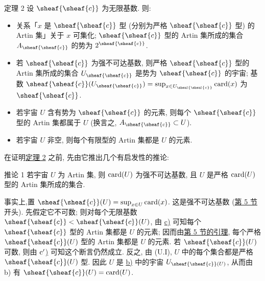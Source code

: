 \hypertarget{sga4.exp.I.appendix.II.sec.6.theorem.2}{}
\begin{enonce*}{定理 2}
设 $\sheaf{\sheaf{c}}$ 为无限基数. 则:
\begin{itemize}
\hypertarget{sga4.exp.I.appendix.II.sec.6.theorem.2.part.a}{}
\item[a)] 关系「$x$ 是 $\sheaf{\sheaf{c}}$ 型 (分别为严格 $\sheaf{\sheaf{c}}$ 型) 的 Artin 集」关于 $x$ 可集化; $\sheaf{\sheaf{c}}$ 型的 Artin 集所成的集合 $A_{\sheaf{\sheaf{c}}}$ 的势为 $2^{\sheaf{\sheaf{c}}}$.

\hypertarget{sga4.exp.I.appendix.II.sec.6.theorem.2.part.b}{}
\item[b)] 若 $\sheaf{\sheaf{c}}$ 为强不可达基数, 则严格 $\sheaf{\sheaf{c}}$ 型的 Artin 集所成的集合 $U_{\sheaf{\sheaf{c}}}$ 是势为 $\sheaf{\sheaf{c}}$ 的宇宙; 基数 $\sheaf{\sheaf{c}}(U_{\sheaf{\sheaf{c}}})=\sup_{x\in U_{\sheaf{\sheaf{c}}}}\card(x)$ 为 $\sheaf{\sheaf{c}}$.

\hypertarget{sga4.exp.I.appendix.II.sec.6.theorem.2.part.c}{}
\item[c)] 若宇宙 $U$ 含有势为 $\sheaf{\sheaf{c}}$ 的元素, 则每个 $\sheaf{\sheaf{c}}$ 型的 Artin 集都属于 $U$ (换言之, $A_{\sheaf{\sheaf{c}}}\subset U$).

\hypertarget{sga4.exp.I.appendix.II.sec.6.theorem.2.part.c-prime}{}
\item[${\rm c')}$] 若宇宙 $U$ 非空, 则每个有限型的 Artin 集都是 $U$ 的元素.
\end{itemize}
\end{enonce*}
在证明\hyperlink{sga4.exp.I.appendix.II.sec.6.theorem.2}{定理 2} 之前, 先由它推出几个有启发性的推论:

\hypertarget{sga4.exp.I.appendix.II.sec.6.corollary.to.theorem.2.1}{}
\begin{enonce*}{推论 1}
若宇宙 $U$ 为 Artin 集, 则 $\operatorname{card}(U)$ 为强不可达基数, 且 $U$ 是严格 $\operatorname{card}(U)$ 型的 Artin 集所成的集合.
\end{enonce*}

事实上,\pageoriginale 置 $\sheaf{\sheaf{c}}(U)=\sup_{x\in U}\card(x)$. 这是强不可达基数 (\hyperlink{sga4.exp.I.appendix.II.sec.5}{第 5 节}开头). 先假定它不可数; 则对每个无限基数 $\sheaf{\sheaf{c}}<\sheaf{\sheaf{c}}(U)$, 由 \hyperlink{sga4.exp.I.appendix.II.sec.6.theorem.2.part.c}{c)} 可知每个 $\sheaf{\sheaf{c}}$ 型的 Artin 集都是 $U$ 的元素; 因而由\hyperlink{sga4.exp.I.appendix.II.sec.5.lemma.of.section.5}{第 5 节的引理}, 每个严格 $\sheaf{\sheaf{c}}(U)$ 型的 Artin 集都是 $U$ 的元素. 若 $\sheaf{\sheaf{c}}(U)$ 可数, 则由 \hyperlink{sga4.exp.I.appendix.II.sec.6.theorem.2.part.c-prime}{${\rm c'}$)} 可知这个断言仍然成立. 反之, 由 (U.I), $U$ 中的每个集合都是严格 $\sheaf{\sheaf{c}}(U)$ 型. 因此 $U$ 是 \hyperlink{sga4.exp.I.appendix.II.sec.6.theorem.2.part.b}{b)} 中的宇宙 $U_{\sheaf{\sheaf{c}}(U)}$, 从而由 b) 有 $\sheaf{\sheaf{c}}(U)=\card(U)$.

